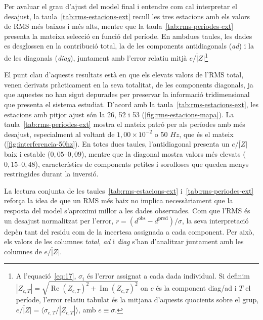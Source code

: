 \documentclass[11pt,a4paper,oneside]{article}
\begin{document}
Per avaluar el grau d'ajust del model final i entendre com cal interpretar el desajust, la taula~\ref{tab:rms-estacions-ext} recull les tres estacions amb els valors de RMS més baixos i més alts, mentre que la taula~\ref{tab:rms-periodes-ext} presenta la mateixa selecció en funció del període. En ambdues taules, les dades es desglossen en la contribució total, la de les components antidiagonals (\textit{ad}) i la de les diagonals (\textit{diag}), juntament amb l'error relatiu mitjà $\overline{e/|Z|}$\footnote{A l'equació~\eqref{eq:17}, $\sigma_i$ és l'error assignat a cada dada
individual. Si definim $|Z_{c,T}|=\sqrt{\operatorname{Re}(Z_{c,T})^2+\operatorname{Im}(Z_{c,T})^2}$
on $c$ és la component diag/ad i $T$ el període, l'error relatiu tabulat és la mitjana d'aquests
quocients sobre el grup, $\overline{e/|Z|}=\big\langle \sigma_{c,T}/|Z_{c,T}|
\big\rangle$, amb $e\equiv\sigma$.}

\vspace{5pt}

El punt clau d'aquests resultats està en que els elevats valors de l'RMS total, venen derivats pràcticament en la seva totalitat, de les components diagonals, ja que aquestes no han sigut depurades per preservar la informació tridimensional que presenta el sistema estudiat. D'acord amb la taula~\ref{tab:rms-estacions-ext}, les estacions amb pitjor ajust són la 26, 52 i 53 (\cref{fig:rms-estacions-mapa}). La taula~\ref{tab:rms-periodes-ext} mostra el mateix patró per als períodes amb més desajust, especialment al voltant de $1{,}00\times10^{-2}$ o 50  $Hz$, que és el mateix (\cref{fig:interferencia-50hz}). En totes dues taules, l'antidiagonal presenta un $\overline{e/|Z|}$ baix i estable ($0{,}05$--$0{,}09$), mentre que la diagonal mostra valors més elevats ($0{,}15$--$0{,}48$), característics de components petites i sorolloses que queden menys restringides durant la inversió.

\vspace{5pt}
La lectura conjunta de les taules~\ref{tab:rms-estacions-ext} i~\ref{tab:rms-periodes-ext} reforça la idea de que un RMS més baix no implica necessàriament que la resposta del model s'aproximi millor a les dades observades. Com que l'RMS és un desajust normalitzat per l'error, $r = (d^{\text{obs}} - d^{\text{pred}})/\sigma$, la seva interpretació depèn tant del residu com de la incertesa assignada a cada component. Per això, els valors de les columnes \textit{total}, \textit{ad} i \textit{diag} s'han d'analitzar juntament amb les columnes de $\overline{e/|Z|}$.
\vspace{5pt}
\end{document}

